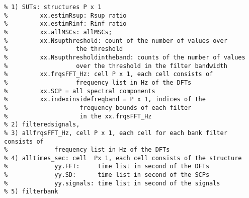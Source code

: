 \begin{verbatim}
% 1) SUTs: structures P x 1
%         xx.estimRsup: Rsup ratio
%         xx.estimRinf: Rinf ratio
%         xx.allMSCs: allMSCs;
%         xx.Nsupthreshold: count of the number of values over
%                   the threshold
%         xx.Nsupthresholdintheband: counts of the number of values
%                   over the threshold in the filter bandwidth
%         xx.frqsFFT_Hz: cell P x 1, each cell consists of
%                   frequency list in Hz of the DFTs
%         xx.SCP = all spectral components
%         xx.indexinsidefreqband = P x 1, indices of the
%                    frequency bounds of each filter
%                    in the xx.frqsFFT_Hz
% 2) filteredsignals, 
% 3) allfrqsFFT_Hz, cell P x 1, each cell for each bank filter consists of
%             frequency list in Hz of the DFTs
% 4) alltimes_sec: cell  Px 1, each cell consists of the structure
%             yy.FFT:     time list in second of the DFTs
%             yy.SD:      time list in second of the SCPs
%             yy.signals: time list in second of the signals
% 5) filterbank



\end{verbatim}



